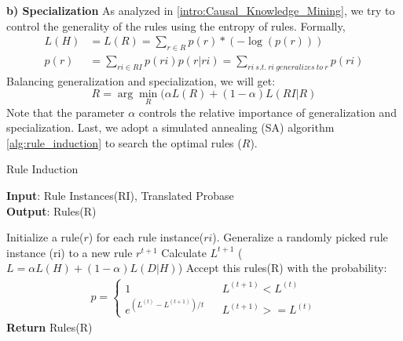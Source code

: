 \textbf{b) Specialization}
As analyzed in \ref{intro:Causal_Knowledge_Mining}, we try to control the generality of the rules using the entropy of rules. Formally,
\begin{equation*}
\begin{split}
L(H)&=L(R)=\sum_{r \in R}{p(r)*(-\log(p(r)))}\\
p(r)&=\sum_{ri \in RI}{p(ri)p(r|ri)}=\sum_{ri \ s.t.\ ri\ generalizes\ to\ r}p(ri)
\end{split}
\label{equ:mdl_2}
\end{equation*}
Balancing generalization and specialization, we will get:
$$R=\arg\min_{R}(\alpha L(R)+(1-\alpha)L(RI|R)\label{eq:objective_function}$$
Note that the parameter $\alpha$ controls the relative importance of generalization and specialization.  
Last, we adopt a simulated annealing (SA) algorithm \ref{alg:rule_induction} to search the optimal rules ($R$). 
\begin{algorithm}[htb]
\caption{Rule Induction\label{alg:rule_induction}} 
\textbf{Input}: Rule Instances(RI), Translated Probase\\
\textbf{Output}: Rules(R)
\begin{algorithmic}[1]
	\STATE Initialize a rule($r$) for each rule instance($ri$).
	\STATE	Generalize a randomly picked rule instance (ri) to a new rule $r^{t+1}$
	\STATE	Calculate $L^{t+1}$ ($L=\alpha L(H)+(1-\alpha)L(D|H)$)
	\STATE	Accept this rules(R) with the probability:
	\STATE	\begin{equation*}\begin{split}p=\left\{\begin{array}{rcl}1 & & {L^{(t+1)} < L^{(t)}}\\e^{(L^{(t)}-L^{(t+1)})/t}& &{L^{(t+1)}>= L^{(t)}}\end{array} \right.	\end{split}\end{equation*}
	\ENDWHILE
	\STATE \textbf{Return} Rules(R) 
\end{algorithmic}
\end{algorithm}	




